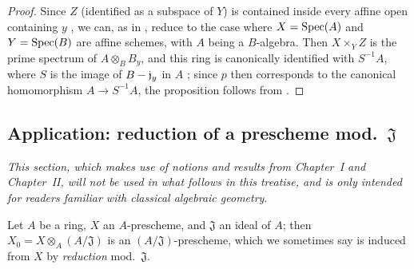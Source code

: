 \begin{proof}
\label{proof-I.3.6.5}
Since $Z$ (identified as a subspace of $Y$) is contained inside every affine open containing $y$ , we can, as in , reduce to the case where $X=\operatorname{Spec}(A)$ and $Y=\operatorname{Spec}(B)$ are affine schemes, with $A$ being a $B$-algebra.
Then $X\times_Y Z$ is the prime spectrum of $A\otimes_B B_y$, and this ring is canonically identified with $S^{-1}A$, where $S$ is the image of $B-\mathfrak{j}_y$ in $A$ ; since $p$ then corresponds to the canonical homomorphism $A\to S^{-1}A$, the proposition follows from .
\end{proof}

\subsection{Application: reduction of a prescheme mod.~$\mathfrak{J}$}
\label{subsection:I.3.7}

\emph{This section, which makes use of notions and results from Chapter~I and Chapter~II, will not be used in what follows in this treatise, and is only intended for readers familiar with classical algebraic geometry}.

\begin{env}[3.7.1]
\label{I.3.7.1}
Let $A$ be a ring, $X$ an $A$-prescheme, and $\mathfrak{J}$ an ideal of $A$; then $X_0=X\otimes_A(A/\mathfrak{J})$ is an $(A/\mathfrak{J})$-prescheme, which we sometimes say is induced from $X$ by \emph{reduction} mod.~$\mathfrak{J}$.
\end{env}

